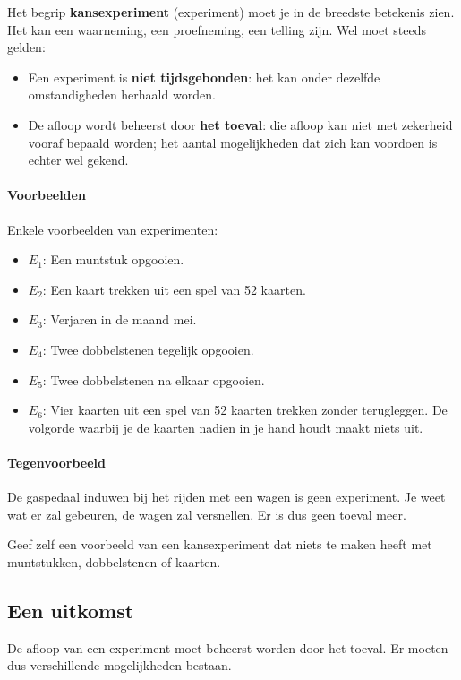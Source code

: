 \documentclass[12pt,twoside]{article}
\begin{document}
Het begrip {\bf kansexperiment} (experiment) moet je in de breedste betekenis zien. Het kan een
waarneming, een proefneming, een telling zijn. Wel moet steeds gelden:
\begin{itemize}
  \item Een experiment is {\bf niet tijdsgebonden}: het kan onder dezelfde omstandigheden
herhaald worden.
  \item De afloop wordt beheerst door {\bf het toeval}: die afloop kan niet met zekerheid
vooraf bepaald worden; het aantal mogelijkheden dat zich kan voordoen is
echter wel gekend.
\end{itemize}

\paragraph*{Voorbeelden} Enkele voorbeelden van experimenten:
\begin{itemize}
  \item $E_1$: Een muntstuk opgooien.
  \item $E_2$: Een kaart trekken uit een spel van 52 kaarten.
  \item $E_3$: Verjaren in de maand mei.
  \item $E_4$: Twee dobbelstenen tegelijk opgooien.
  \item $E_5$: Twee dobbelstenen na elkaar opgooien.
  \item $E_6$: Vier kaarten uit een spel van 52 kaarten trekken zonder terugleggen. De volgorde waarbij je de kaarten nadien in je hand houdt maakt niets uit.
\end{itemize}

\paragraph*{Tegenvoorbeeld}
De gaspedaal induwen bij het rijden met een wagen is geen experiment. Je weet wat er zal gebeuren, de wagen zal versnellen. Er is dus geen toeval meer.

\begin{oefening}
Geef zelf een voorbeeld van een kansexperiment dat niets te maken heeft met muntstukken, dobbelstenen of kaarten.
\end{oefening}

\subsection{Een uitkomst}

De afloop van een experiment moet beheerst worden door het toeval. Er moeten dus verschillende mogelijkheden bestaan.
\end{document}

